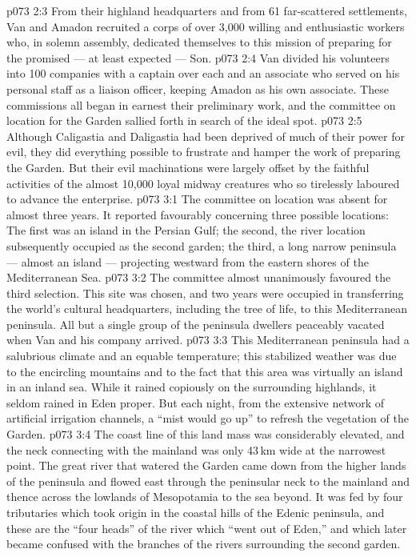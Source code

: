 \vs p073 2:3 From their highland headquarters and from 61 far\hyp{}scattered settlements, Van and Amadon recruited a corps of over 3,000 willing and enthusiastic workers who, in solemn assembly, dedicated themselves to this mission of preparing for the promised --- at least expected --- Son.
\vs p073 2:4 Van divided his volunteers into 100 companies with a captain over each and an associate who served on his personal staff as a liaison officer, keeping Amadon as his own associate. These commissions all began in earnest their preliminary work, and the committee on location for the Garden sallied forth in search of the ideal spot.
\vs p073 2:5 \pc Although Caligastia and Daligastia had been deprived of much of their power for evil, they did everything possible to frustrate and hamper the work of preparing the Garden. But their evil machinations were largely offset by the faithful activities of the almost 10,000 loyal midway creatures who so tirelessly laboured to advance the enterprise.
\vs p073 3:1 The committee on location was absent for almost three years. It reported favourably concerning three possible locations: The first was an island in the Persian Gulf; the second, the river location subsequently occupied as the second garden; the third, a long narrow peninsula --- almost an island --- projecting westward from the eastern shores of the Mediterranean Sea.
\vs p073 3:2 The committee almost unanimously favoured the third selection. This site was chosen, and two years were occupied in transferring the world’s cultural headquarters, including the tree of life, to this Mediterranean peninsula. All but a single group of the peninsula dwellers peaceably vacated when Van and his company arrived.
\vs p073 3:3 \pc This Mediterranean peninsula had a salubrious climate and an equable temperature; this stabilized weather was due to the encircling mountains and to the fact that this area was virtually an island in an inland sea. While it rained copiously on the surrounding highlands, it seldom rained in Eden proper. But each night, from the extensive network of artificial irrigation channels, a “mist would go up” to refresh the vegetation of the Garden.
\vs p073 3:4 The coast line of this land mass was considerably elevated, and the neck connecting with the mainland was only 43\,km wide at the narrowest point. The great river that watered the Garden came down from the higher lands of the peninsula and flowed east through the peninsular neck to the mainland and thence across the lowlands of Mesopotamia to the sea beyond. It was fed by four tributaries which took origin in the coastal hills of the Edenic peninsula, and these are the “four heads” of the river which “went out of Eden,” and which later became confused with the branches of the rivers surrounding the second garden.
